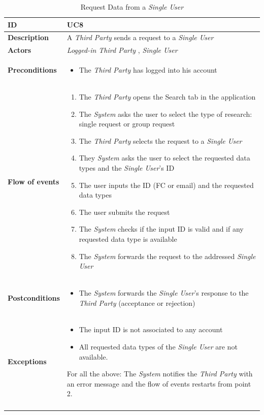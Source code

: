 \documentclass[titlepage]{article}
\begin{document}
\begin{longtable}{| p{3 cm} | p{10 cm} |} 
			\hline
			{\bf ID} & UC8 \\
			\hline
			{\bf Description} & A {\it Third Party} sends a request to a {\it Single User} \\
			\hline
			{\bf Actors} & {\it Logged-in {\it Third Party} }, {\it Single User} \\
			\hline
			{\bf Preconditions} & 		
							\begin{itemize}
								\item The {\it Third Party} has logged into his account
							\end{itemize}
			\\
			\hline
			{\bf Flow of events} & 
							\begin{enumerate}
								\item The {\it Third Party} opens the Search tab in the application
\item The {\it System} asks the user to select the type of research: single request or group request
\item The {\it Third Party} selects the request to a {\it Single User}
\item They {\it System} asks the user to select the requested data types and the {\it Single User}’s ID
\item The user inputs the ID (FC or email) and the requested data types 
\item The user submits the request
\item The {\it System} checks if the input ID is valid and if any requested data type is available
\item The {\it System} forwards the request to the addressed {\it Single User}

							\end{enumerate}
			
			 \\
			\hline
			{\bf Postconditions} & 
							\begin{itemize}
								\item The {\it System} forwards the {\it Single User}’s response to the {\it Third Party} (acceptance or rejection)

							\end{itemize}
			\\
			\hline
			{\bf Exceptions} & 
							\begin{itemize}
								\item The input ID is not associated to any account
\item All requested data types of the {\it Single User} are not available.

							\end{itemize}
							For all the above: The {\it System} notifies the {\it Third Party} with an error message and the flow of events restarts from point 2.

							
			\\
			\hline
			\caption{Request Data from a {\it Single User}}
			\end{longtable}
\end{document}
